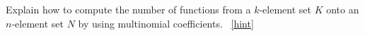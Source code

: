 \documentclass{book}
\begin{document}
\setcounter{project}{283}
\addtocounter{project}{-1}
\begin{activity}[]\label{activity-276}
\hypertarget{p-1475}{}%
Explain how to compute the number of functions from a \(k\)-element set \(K\) onto an \(n\)-element set \(N\) by using multinomial coefficients.%
~\hfill{\tiny\hyperlink{a-283}{[hint]}\hypertarget{q-283}{}}\end{activity}
\end{document}
